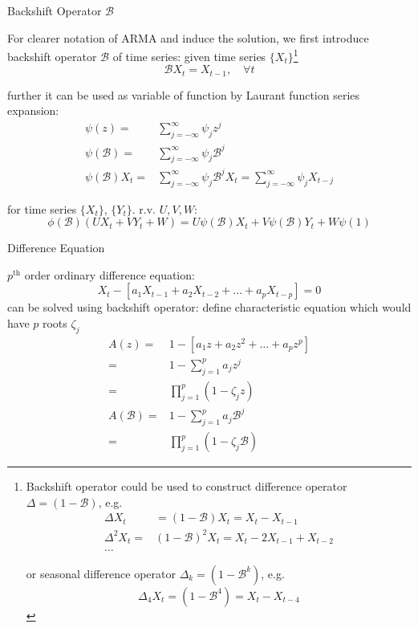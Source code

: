 \begin{point}
    Backshift Operator $ \mathscr{B}  $
\end{point}

    For clearer notation of ARMA and induce the solution, we first introduce backshift operator $ \mathscr{B}  $ of time series: given time series $ \{X_t\} $\footnote{Backshift operator could be used to construct difference operator $ \Delta =(1-\mathscr{B} ) $, e.g.
    \begin{align*}
        \Delta X_t&=(1-\mathscr{B} )X_t=X_t-X_{t-1}\\
        \Delta ^2X_t=&(1-\mathscr{B} )^2X_t=X_t-2X_{t-1}+X_{t-2}\\
        \ldots&
    \end{align*}
    
    or seasonal difference operator $ \Delta _k=(1-\mathscr{B} ^k) $, e.g.
    \begin{equation}
        \Delta _4X_t=(1-\mathscr{B} ^4)=X_t-X_{t-4} 
    \end{equation}
    
    }
    \begin{equation}
         \mathscr{B} X_t=X_{t-1},\quad \forall t
    \end{equation}
    
    further it can be used as variable of function by Laurant function series expansion:
    \begin{align*}
        \psi (z)=&\sum_{j=-\infty}^\infty \psi _{j}z^j\\
        \psi (\mathscr{B} )=&\sum_{j=-\infty}^\infty \psi _{j}\mathscr{B}^j \\
        \psi (\mathscr{B} )X_t=&\sum_{j=-\infty}^\infty \psi _{j}\mathscr{B}^jX_t=\sum_{j=-\infty}^\infty \psi _{j}X_{t-j}
    \end{align*} 

    for time series $ \{X_t\} $, $ \{Y_t\} $. r.v. $ U,V,W $:
    \begin{equation}
        \phi (\mathscr{B} )(UX_t+VY_t+W)=U\psi (\mathscr{B} )X_t+V\psi (\mathscr{B} )Y_t+W\psi (1) 
    \end{equation}

\begin{point}
    Difference Equation
\end{point}

    $ p^\mathrm{th}  $ order ordinary difference equation:
    \begin{equation}
        X_t-\left[a_1X_{t-1}+a_2X_{t-2}+\ldots+a_pX_{t-p}\right]=0 
    \end{equation}
    can be solved using backshift operator: define characteristic equation which would have $ p $ roots $ \zeta _j $
    \begin{align*}
        A(z)=&1-\left[a_1z+a_2z^2+\ldots+a_pz^p\right]\\
        =&1-\sum_{j=1}^pa_jz^j\\
        =&\prod_{j=1}^p(1-\zeta _jz)\\
        A(\mathscr{B} )=&1-\sum_{j=1}^pa_j\mathscr{B} ^j\\
        =&\prod_{j=1}^p(1-\zeta _j\mathscr{B} )
    \end{align*}
    
